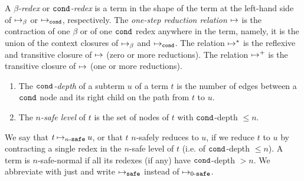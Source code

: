A \emph{$\beta$-redex} or \emph{${\tt cond}$-redex} is a term in the shape of the term at the left-hand side of $\mathbin{\mapsto}_\beta$ or $\mathbin{\mapsto}_{\tt cond}$, respectively. 
The \emph{one-step reduction relation} $\mathbin{\mapsto}$
is the contraction of one $\beta$ or of one ${\tt cond}$ redex anywhere
in the term, namely,
it is the union of the context closures of $\mathbin{\mapsto}_\beta$ and $\mathbin{\mapsto}_{\tt cond}$.
The relation $\mathbin{\mapsto}^*$ is the reflexive and 
transitive closure of $\mathbin{\mapsto}$ (zero or more reductions).
The relation $\mathbin{\mapsto}^{+}$ is the 
transitive closure of $\mathbin{\mapsto}$ (one or more reductions).


\begin{definition}
\begin{enumerate}
\item
The \emph{${\tt cond}$-depth} of a subterm $u$ of a term $t$ is 
the number of edges between a ${\tt cond}$ node and its right child on the path
from $t$ to $u$. 
\item
The \emph{$n$-safe level} of $t$ is the set of nodes of $t$ with ${\tt cond}$-depth $\le n$.
\end{enumerate}
\end{definition}

We say that $t \nsafeReduces{n} u$, or that $t$ $n$-safely reduces to $u$,  
if we reduce $t$ to $u$ by contracting a single redex in the $n$-safe level of $t$ 
(i.e. of ${\tt cond}$-depth $\le n$).
A term is $n$-safe-normal if all its redexes (if any) have ${\tt cond}$-depth $>n$.
We abbreviate  
with just  and write $\safeReduces$ instead of $\nsafeReduces{0}$.




